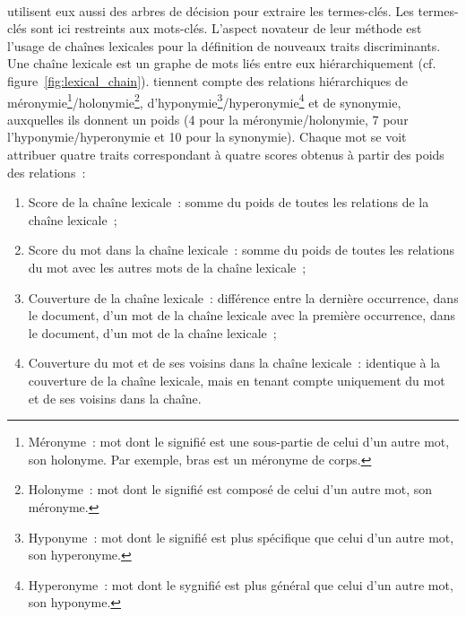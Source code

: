         ~\\ utilisent eux aussi des arbres de
        décision pour extraire les termes-clés. Les termes-clés sont ici
        restreints aux mots-clés. L'aspect novateur de leur méthode est l'usage
        de chaînes lexicales pour la définition de nouveaux traits
        discriminants. Une chaîne lexicale est un graphe de mots liés entre eux
        hiérarchiquement (cf. figure~\ref{fig:lexical_chain}).
         tiennent compte des relations
        hiérarchiques de méronymie\footnote{Méronyme~: mot dont le signifié est
        une sous-partie de celui d'un autre mot, son holonyme. Par exemple,
        \og{}bras\fg{} est un méronyme de
        \og{}corps\fg{}.}/holonymie\footnote{Holonyme~: mot dont le signifié est
        composé de celui d'un autre mot, son méronyme.},
        d'hyponymie\footnote{Hyponyme~: mot dont le signifié est
        plus spécifique que celui d'un autre mot, son
        hyperonyme.}/hyperonymie\footnote{Hyperonyme~: mot dont le sygnifié est
        plus général que celui d'un autre mot, son hyponyme.} et de synonymie,
        auxquelles ils donnent un poids (4 pour la méronymie/holonymie, 7 pour
        l'hyponymie/hyperonymie et 10 pour la synonymie). Chaque mot se voit
        attribuer quatre traits correspondant à quatre scores obtenus à partir
        des poids des relations~:
        \begin{enumerate}
          \item{Score de la chaîne lexicale~: somme du poids de toutes les
                relations de la chaîne lexicale~;}
          \item{Score du mot dans la chaîne lexicale~: somme du poids de toutes
                les relations du mot avec les autres mots de la chaîne
                lexicale~;}
          \item{Couverture de la chaîne lexicale~: différence entre la dernière
                occurrence, dans le document, d'un mot de la chaîne lexicale
                avec la première occurrence, dans le document, d'un mot de la
                chaîne lexicale~;}
          \item{Couverture du mot et de ses voisins dans la chaîne lexicale~:
                identique à la couverture de la chaîne lexicale, mais en tenant
                compte uniquement du mot et de ses voisins dans la chaîne.}
        \end{enumerate}
